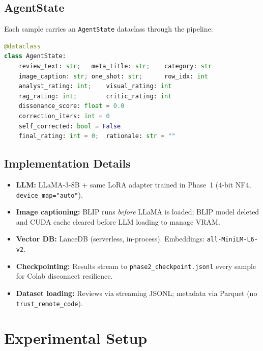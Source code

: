 \documentclass[12pt,a4paper]{article}
\begin{document}
\subsection{AgentState}

Each sample carries an \texttt{AgentState} dataclass through the pipeline:

\begin{lstlisting}[basicstyle=\small\ttfamily, frame=single, language=Python,
  caption={AgentState dataclass (simplified)}]
@dataclass
class AgentState:
    review_text: str;   meta_title: str;    category: str
    image_caption: str; one_shot: str;      row_idx: int
    analyst_rating: int;    visual_rating: int
    rag_rating: int;        critic_rating: int
    dissonance_score: float = 0.0
    correction_iters: int = 0
    self_corrected: bool = False
    final_rating: int = 0;  rationale: str = ""
\end{lstlisting}

\subsection{Implementation Details}

\begin{itemize}[leftmargin=*]
  \item \textbf{LLM:} LLaMA-3-8B + same LoRA adapter trained in Phase~1 (4-bit NF4,
    \texttt{device\_map="auto"}).
  \item \textbf{Image captioning:} BLIP runs \emph{before} LLaMA is loaded; BLIP model
    deleted and CUDA cache cleared before LLM loading to manage VRAM.
  \item \textbf{Vector DB:} LanceDB (serverless, in-process). Embeddings: \texttt{all-MiniLM-L6-v2}.
  \item \textbf{Checkpointing:} Results stream to \texttt{phase2\_checkpoint.jsonl} every sample
    for Colab disconnect resilience.
  \item \textbf{Dataset loading:} Reviews via streaming JSONL; metadata via Parquet (no
    \texttt{trust\_remote\_code}).
\end{itemize}

\section{Experimental Setup}
\end{document}
